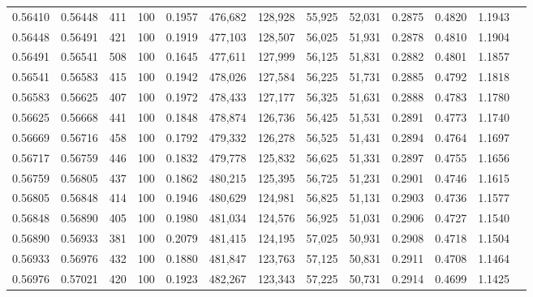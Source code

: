 \begin{tabular}{rrrrrrrrrrrrr}
0.56410 & 0.56448 &   411 & 100 &                                     0.1957 & 476,682 & 128,928 &  55,925 &  52,031 & 0.2875 & 0.4820 & 1.1943 \\
0.56448 & 0.56491 &   421 & 100 &                                     0.1919 & 477,103 & 128,507 &  56,025 &  51,931 & 0.2878 & 0.4810 & 1.1904 \\
0.56491 & 0.56541 &   508 & 100 &                                     0.1645 & 477,611 & 127,999 &  56,125 &  51,831 & 0.2882 & 0.4801 & 1.1857 \\
0.56541 & 0.56583 &   415 & 100 &                                     0.1942 & 478,026 & 127,584 &  56,225 &  51,731 & 0.2885 & 0.4792 & 1.1818 \\
0.56583 & 0.56625 &   407 & 100 &                                     0.1972 & 478,433 & 127,177 &  56,325 &  51,631 & 0.2888 & 0.4783 & 1.1780 \\
0.56625 & 0.56668 &   441 & 100 &                                     0.1848 & 478,874 & 126,736 &  56,425 &  51,531 & 0.2891 & 0.4773 & 1.1740 \\
0.56669 & 0.56716 &   458 & 100 &                                     0.1792 & 479,332 & 126,278 &  56,525 &  51,431 & 0.2894 & 0.4764 & 1.1697 \\
0.56717 & 0.56759 &   446 & 100 &                                     0.1832 & 479,778 & 125,832 &  56,625 &  51,331 & 0.2897 & 0.4755 & 1.1656 \\
0.56759 & 0.56805 &   437 & 100 &                                     0.1862 & 480,215 & 125,395 &  56,725 &  51,231 & 0.2901 & 0.4746 & 1.1615 \\
0.56805 & 0.56848 &   414 & 100 &                                     0.1946 & 480,629 & 124,981 &  56,825 &  51,131 & 0.2903 & 0.4736 & 1.1577 \\
0.56848 & 0.56890 &   405 & 100 &                                     0.1980 & 481,034 & 124,576 &  56,925 &  51,031 & 0.2906 & 0.4727 & 1.1540 \\
0.56890 & 0.56933 &   381 & 100 &                                     0.2079 & 481,415 & 124,195 &  57,025 &  50,931 & 0.2908 & 0.4718 & 1.1504 \\
0.56933 & 0.56976 &   432 & 100 &                                     0.1880 & 481,847 & 123,763 &  57,125 &  50,831 & 0.2911 & 0.4708 & 1.1464 \\
0.56976 & 0.57021 &   420 & 100 &                                     0.1923 & 482,267 & 123,343 &  57,225 &  50,731 & 0.2914 & 0.4699 & 1.1425 \\

\end{tabular}
